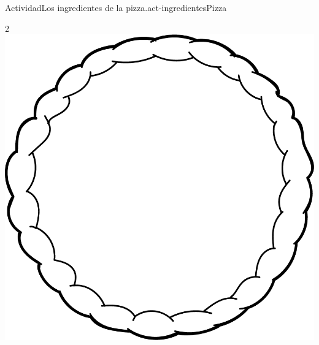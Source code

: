 \documentclass[20pt]{extarticle}
\begin{document}
\begin{activity}{Actividad}{Los ingredientes de la pizza.}{act-ingredientesPizza}%
\begin{image}{0}{1}{0}{2\baselineskip}%
\includegraphics[width=\linewidth, center]{external/png-source/pizza.png}
\end{image}%
\end{activity}
\end{document}
